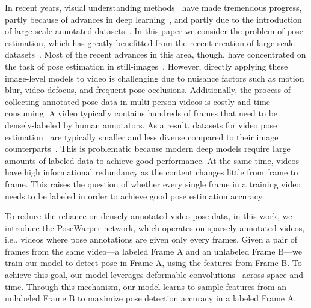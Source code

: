 \documentclass{article}
\begin{document}
In recent years, visual understanding methods~\cite{gberta_2015_CVPR,xie2016groups,DBLP:journals/corr/ToshevS13,gberta_2017_CVPR,SPP,he2017maskrcnn,lin2017focal,ren2015faster,girshick15fastrcnn,girshick2014rcnn,guptaECCV14,44872,dai16rfcn,DBLP:journals/corr/RedmonDGF15,DBLP:journals/corr/RedmonF16} have made tremendous progress, partly because of advances in deep learning~\cite{NIPS2012_4824,43022,Simonyan14c,He2016DeepRL}, and partly due to the introduction of large-scale annotated datasets~\cite{imagenet_cvpr09,coco_paper}. In this paper we consider the problem of pose estimation, which has greatly benefitted from the recent creation of large-scale datasets~\cite{Iqbal_CVPR2017,xiao2018simple}. Most of the recent advances in this area, though, have concentrated on the task of pose estimation in still-images~\cite{DBLP:journals/corr/ToshevS13,xiao2018simple,cao2017realtime,DBLP:conf/eccv/NewellYD16,DBLP:conf/cvpr/WeiRKS16,sun2019deep}.  However, directly applying these image-level models to video is challenging due to nuisance factors such as motion blur, video defocus, and frequent pose occlusions. Additionally, the process of collecting annotated pose data in multi-person videos is costly and time consuming. A video typically contains hundreds of frames that need to be densely-labeled by human annotators. As a result, datasets for video pose estimation~\cite{Iqbal_CVPR2017} are typically smaller and less diverse compared to their image counterparts~\cite{coco_paper}. This is problematic because modern deep models require large amounts of labeled data to achieve good performance. At the same time, videos have high informational redundancy as the content changes little from frame to frame. This raises the question of whether every single frame in a training video needs to be labeled in order to achieve good pose estimation accuracy.





To reduce the reliance on densely annotated video pose data, in this work, we introduce the PoseWarper network, which operates on sparsely annotated videos, i.e., videos where pose annotations are given only every  frames. Given a pair of frames from the same video---a labeled Frame A and an unlabeled Frame B---we train our model to detect pose in Frame A, using the features from Frame B. To achieve this goal, our model leverages deformable convolutions~\cite{8237351} across space and time. Through this mechanism, our model learns to sample features from an unlabeled Frame B to maximize pose detection accuracy in a labeled Frame A. 
\end{document}
